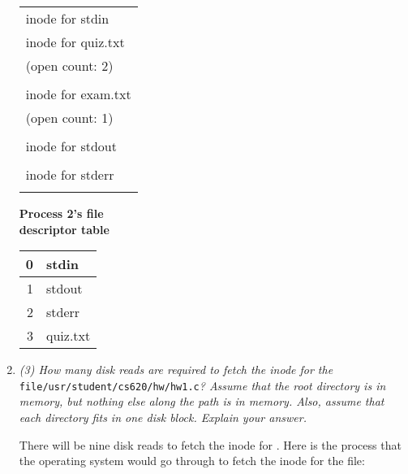 \documentclass[letterpaper,11pt]{article}
\begin{document}
\begin{enumerate}
\begin{minipage}[t]{0.3\textwidth}
\begin{center}
  \begin{tabular}{|l |}
    \hline
    \\ \hline
    inode for stdin \\ \hline
    inode for quiz.txt \\ (open count: 2) \\ \hline    
    \\ \hline
    inode for exam.txt \\ (open count: 1) \\ \hline     
    \\ \hline
    inode for stdout \\ \hline  
    \\ \hline
    inode for stderr \\ \hline 
    \\ \hline
  \end{tabular}
\end{center}
\end{minipage}
\begin{minipage}[t]{0.3\textwidth}
\begin{center}
\textbf{Process 2's file \\ descriptor table}

  \begin{tabular}{|r | l |}
    \hline
    0 & stdin \\ \hline
    1 & stdout  \\ \hline
    2 & stderr \\ \hline
    3 & quiz.txt \\ \hline
  \end{tabular}
\end{center}
\end{minipage}

\item \textit{(3) How many disk reads are required to fetch the inode for the }\verb+file/usr/student/cs620/hw/hw1.c+\textit{? Assume that the root directory is in memory, but nothing else along the path is in memory.  Also, assume that each directory fits in one disk block. Explain your answer.}

There will be nine disk reads to fetch the inode for \verb++.  Here is the process that the operating system would go through to fetch the inode for the file:


\end{enumerate}
\end{document}
